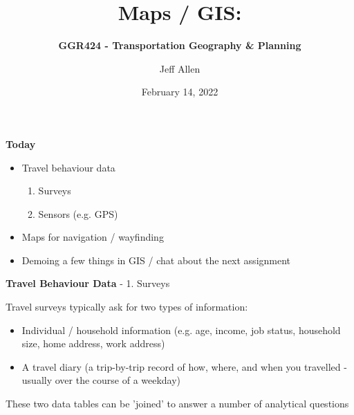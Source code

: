 \documentclass[aspectratio=169]{beamer}
\title{\textbf{Maps / GIS:}}
\subtitle{\textbf{GGR424 - Transportation Geography \& Planning}}
\author{Jeff Allen}
\institute{University of Toronto}
\date{February 14, 2022}
\begin{document}
	
\begin{frame}
	\titlepage	
\end{frame}



\begin{frame}
	
	\textbf{Today}
	
	
	\begin{itemize}
		
		\item Travel behaviour data
		\begin{enumerate}
			\item Surveys
			\item Sensors (e.g. GPS)
		\end{enumerate}
		\item Maps for navigation / wayfinding
		\item Demoing a few things in GIS / chat about the next assignment
		
	\end{itemize}
	
	
\end{frame}






\begin{frame}
	
	\textbf{Travel Behaviour Data} - 1. Surveys
	
	\vspace{2mm}
	
	Travel surveys typically ask for two types of information:
	
	\begin{itemize}
		\item Individual / household information (e.g. age, income, job status, household size, home address, work address)
		
		\item A travel diary (a trip-by-trip record of how, where, and when you travelled - usually over the course of a weekday)
	\end{itemize}

	These two data tables can be 'joined' to answer a number of analytical questions

\end{frame}









\end{document}
